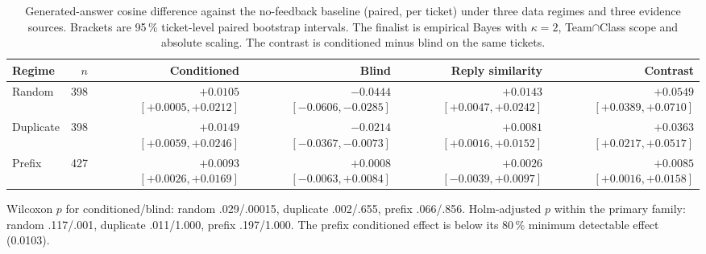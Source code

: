 \begin{table}[t]
\centering
\begin{threeparttable}
\caption{Generated-answer cosine difference against the no-feedback baseline
(paired, per ticket) under three data regimes and three evidence sources.
Brackets are 95\,\% ticket-level paired bootstrap intervals. The finalist is
empirical Bayes with $\kappa=2$, Team$\cap$Class scope and absolute scaling.
The contrast is conditioned minus blind on the same tickets.}
\label{tab:generated}
\begin{tabular}{@{}lrrrrr@{}}
\toprule
Regime & $n$ & Conditioned & Blind & Reply similarity & Contrast \\
\midrule
Random    & 398 & $+0.0105$ $[+0.0005, +0.0212]$ & $-0.0444$ $[-0.0606, -0.0285]$ & $+0.0143$ $[+0.0047, +0.0242]$ & $+0.0549$ $[+0.0389, +0.0710]$ \\
Duplicate & 398 & $+0.0149$ $[+0.0059, +0.0246]$ & $-0.0214$ $[-0.0367, -0.0073]$ & $+0.0081$ $[+0.0016, +0.0152]$ & $+0.0363$ $[+0.0217, +0.0517]$ \\
Prefix    & 427 & $+0.0093$ $[+0.0026, +0.0169]$ & $+0.0008$ $[-0.0063, +0.0084]$ & $+0.0026$ $[-0.0039, +0.0097]$ & $+0.0085$ $[+0.0016, +0.0158]$ \\
\bottomrule
\end{tabular}
\begin{tablenotes}[flushleft]
\footnotesize
\item Wilcoxon $p$ for conditioned/blind: random .029/.00015, duplicate
.002/.655, prefix .066/.856. Holm-adjusted $p$ within the primary family:
random .117/.001, duplicate .011/1.000, prefix .197/1.000. The prefix
conditioned effect is below its 80\,\% minimum detectable effect (0.0103).
\end{tablenotes}
\end{threeparttable}
\end{table}

